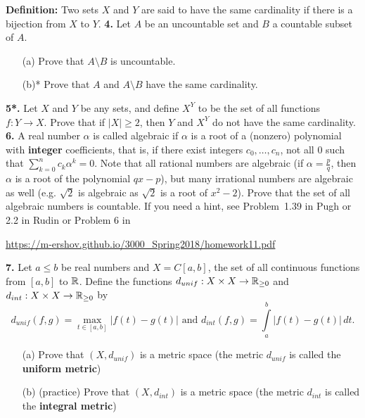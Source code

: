 \documentclass[11pt]{amsart}
\begin{document}
\skv
{\bf Definition:} Two sets $X$ and $Y$ are said to have the same cardinality
if there is a bijection from $X$ to $Y$.
\skv
{\bf 4.} Let $A$ be an uncountable set and $B$ a countable subset of $A$.
\begin{itemize}
\item[(a)] Prove that $A\setminus B$ is uncountable.
\item[(b)*] Prove that $A$ and $A\setminus B$ have the same cardinality.
\end{itemize}
\skv
{\bf 5*.} Let $X$ and $Y$ be any sets, and define $X^Y$ to be the
set of all functions $f: Y\to X$. Prove that if $|X|\geq 2$, then
$Y$ and $X^Y$ do not have the same cardinality. 
\skv
{\bf 6.} A real number $\alpha$ is called algebraic if $\alpha$ is a root of a (nonzero) polynomial with 
{\bf integer} coefficients, that is, if there exist integers $c_0,\ldots,c_n$, not all $0$ such that $\sum\limits_{k=0}^n c_k \alpha^k=0$. Note that all rational numbers are algebraic (if $\alpha=\frac{p}{q}$, then $\alpha$ is a root of the polynomial $qx-p$), but many irrational numbers are algebraic as well (e.g. $\sqrt{2}$ is algebraic as $\sqrt{2}$ is a root of $x^2-2$). 
Prove that the set of all algebraic numbers is countable.
\skv
If you need a hint, see Problem~1.39 in Pugh or 2.2 in Rudin or Problem 6 in
\skv
\centerline{
\url{https://m-ershov.github.io/3000_Spring2018/homework11.pdf}
}
\skv
{\bf 7.} Let $a\leq b$ be real numbers and $X=C[a,b]$, the set of all continuous functions
from $[a,b]$ to ${\mathbb R}$. Define the functions $d_{unif}:X\times X\to{\mathbb R}_{\geq 0}$ and $d_{int}:X\times X\to{\mathbb R}_{\geq 0}$ 
by $$d_{unif}(f,g)=\max\limits_{t\in [a,b]} |f(t)-g(t)| \mbox{ and }d_{int}(f,g)=\int\limits_{a}^b |f(t)-g(t)|\,dt.$$
\begin{itemize}
\item[(a)] Prove that $(X,d_{unif})$ is a metric space (the metric $d_{unif}$ is called the {\bf uniform metric})
\item[(b)] (practice) Prove that $(X,d_{int})$ is a metric space (the metric $d_{int}$ is called the {\bf integral metric})
\end{itemize}
\skv
\end{document}
